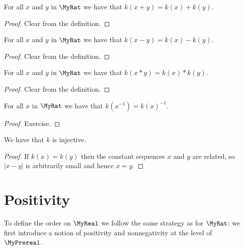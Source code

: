 \begin{lemma}
    \label{MyReal.k_add}
    \leanok
For all $x$ and $y$ in $\MyRat$ we have that $k(x + y) = k(x) + k(y)$.
\end{lemma}
\begin{proof}
    \leanok
Clear from the definition.
\end{proof}

\begin{lemma}
    \label{MyReal.k_sub}
    \leanok
For all $x$ and $y$ in $\MyRat$ we have that $k(x - y) = k(x) - k(y)$.
\end{lemma}
\begin{proof}
    \leanok
Clear from the definition.
\end{proof}

\begin{lemma}
    \label{MyReal.k_mul}
    \leanok
For all $x$ and $y$ in $\MyRat$ we have that $k(x * y) = k(x) * k(y)$.
\end{lemma}
\begin{proof}
    \leanok
Clear from the definition.
\end{proof}

\begin{lemma}
    \label{MyReal.k_inv}
    \leanok
For all $x$ in $\MyRat$ we have that $k(x^{-1}) = k(x)^{-1}$.
\end{lemma}
\begin{proof}
    \leanok
Exercise.
\end{proof}

\begin{lemma}
    \label{MyReal.k_injective}
    \leanok
    We have that $k$ is injective.
\end{lemma}
\begin{proof}
    \leanok
    If $k(x) = k(y)$ then the constant sequences $x$ and $y$ are related, so $|x - y|$ is arbitrarily
    small and hence $x = y$.
\end{proof}

\section{Positivity}

To define the order on $\MyReal$ we follow the same strategy as for $\MyRat$: we first introduce a
notion of positivity and nonnegativity at the level of $\MyPrereal$.

